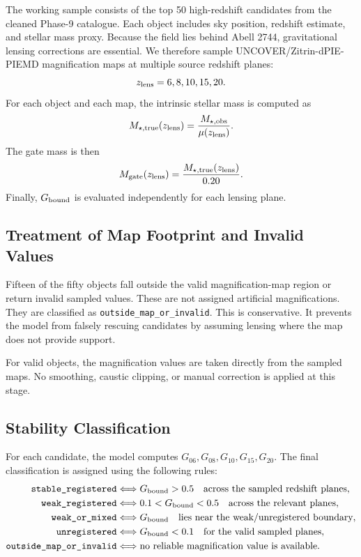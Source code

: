 \documentclass[11pt,a4paper]{article}
\begin{document}
The working sample consists of the top 50 high-redshift candidates from the cleaned Phase-9 catalogue. Each object includes sky position, redshift estimate, and stellar mass proxy. Because the field lies behind Abell 2744, gravitational lensing corrections are essential. We therefore sample UNCOVER/Zitrin-dPIE-PIEMD magnification maps at multiple source redshift planes:
\begin{equation}
z_{\rm lens}=6,8,10,15,20.
\end{equation}
For each object and each map, the intrinsic stellar mass is computed as
\begin{equation}
M_{\star,\rm true}(z_{\rm lens})=\frac{M_{\star,\rm obs}}{\mu(z_{\rm lens})}.
\end{equation}
The gate mass is then
\begin{equation}
M_{\rm gate}(z_{\rm lens})=\frac{M_{\star,\rm true}(z_{\rm lens})}{0.20}.
\end{equation}
Finally, $G_{\rm bound}$ is evaluated independently for each lensing plane.

\subsection{Treatment of Map Footprint and Invalid Values}

Fifteen of the fifty objects fall outside the valid magnification-map region or return invalid sampled values. These are not assigned artificial magnifications. They are classified as \texttt{outside\_map\_or\_invalid}. This is conservative. It prevents the model from falsely rescuing candidates by assuming lensing where the map does not provide support.

For valid objects, the magnification values are taken directly from the sampled maps. No smoothing, caustic clipping, or manual correction is applied at this stage.

\subsection{Stability Classification}

For each candidate, the model computes $G_{06},G_{08},G_{10},G_{15},G_{20}$. The final classification is assigned using the following rules:
\begin{align}
\texttt{stable\_registered} &\Longleftrightarrow G_{\rm bound}>0.5\quad\text{across the sampled redshift planes},\\
\texttt{weak\_registered} &\Longleftrightarrow 0.1<G_{\rm bound}<0.5\quad\text{across the relevant planes},\\
\texttt{weak\_or\_mixed} &\Longleftrightarrow G_{\rm bound}\quad\text{lies near the weak/unregistered boundary},\\
\texttt{unregistered} &\Longleftrightarrow G_{\rm bound}<0.1\quad\text{for the valid sampled planes},\\
\texttt{outside\_map\_or\_invalid} &\Longleftrightarrow \text{no reliable magnification value is available}.
\end{align}
\end{document}

